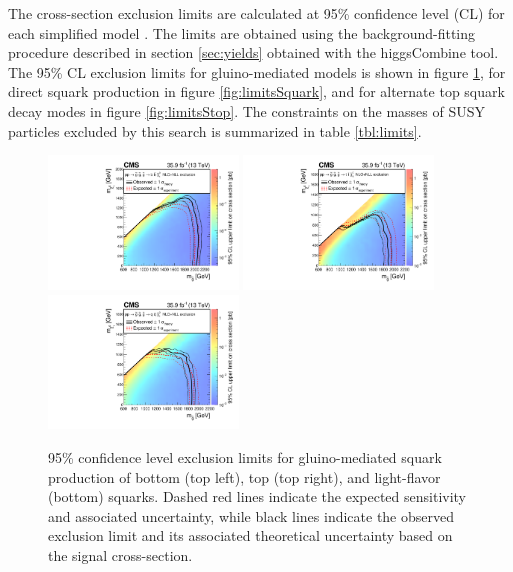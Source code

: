 The cross-section exclusion limits are calculated at 95\% confidence level (CL) for each simplified model \cite{0954-3899-28-10-313, Junk:1999kv, Cowan:2010js}. The limits are obtained using the background-fitting procedure described in section \ref{sec:yields} obtained with the higgsCombine tool. The 95\% CL exclusion limits for gluino-mediated models is shown in figure \ref{fig:limitsGluino}, for direct squark production in figure \ref{fig:limitsSquark}, and for alternate top squark decay modes in figure \ref{fig:limitsStop}. The constraints on the masses of SUSY particles excluded by this search is summarized in table \ref{tbl:limits}.
\begin{figure}
	\centering
	\includegraphics[width=0.45\textwidth]{results/figs/interpretations/T1bbbb_35p9ifb_Moriond2017_Mar07_XSEC}
	\includegraphics[width=0.45\textwidth]{results/figs/interpretations/T1tttt_35p9ifb_Moriond2017_Mar07_XSEC}
	\includegraphics[width=0.45\textwidth]{results/figs/interpretations/T1qqqq_35p9ifb_Moriond2017_Mar07_XSEC}
	\renewcommand{\baselinestretch}{1.0}
	\caption[95\% confidence level exclusion limits for gluino-mediated squark production of bottom (top left), top (top right), and light-flavor (bottom) squarks.]{95\% confidence level exclusion limits for gluino-mediated squark production of bottom (top left), top (top right), and light-flavor (bottom) squarks. Dashed red lines indicate the expected sensitivity and associated uncertainty, while black lines indicate the observed exclusion limit and its associated theoretical uncertainty based on the signal cross-section.}
	\label{fig:limitsGluino}
\end{figure}
